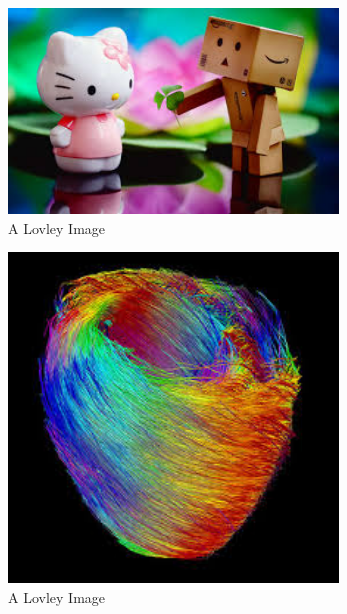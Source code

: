 \documentclass[report]{IEEEtran}
\begin{document}
\begin{figure}[h]
\centering
	\includegraphics[width = 8.75cm]{image2}
	\caption{A Lovley Image}
		
\end{figure}

\begin{figure}[h]
\centering
	\includegraphics[width = 8.75cm]{image1}
	\caption{A Lovley Image}
		
\end{figure}



\end{document}

